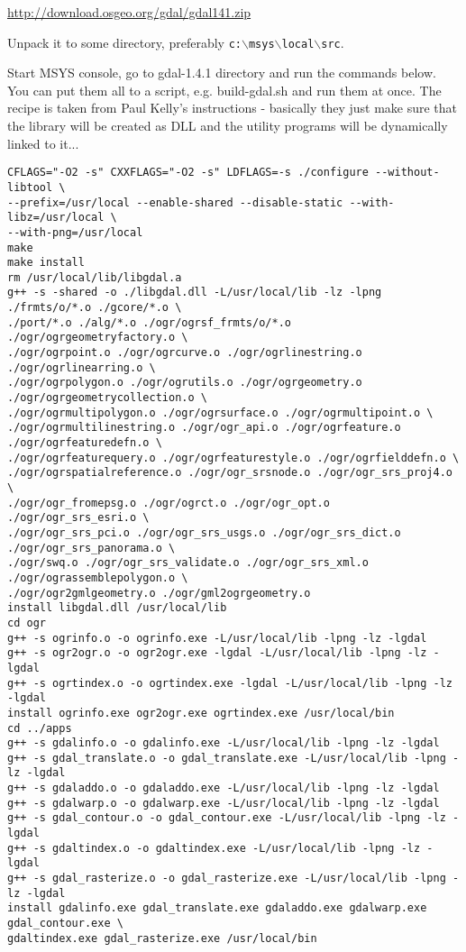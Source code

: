 \url{http://download.osgeo.org/gdal/gdal141.zip}

Unpack it to some directory, preferably \texttt{c:$\backslash$msys$\backslash$local$\backslash$src}.

Start MSYS console, go to gdal-1.4.1 directory and run the commands below.
You can put them all to a script, e.g. build-gdal.sh and run them at once.
The recipe is taken from Paul Kelly's instructions - basically they
just make sure that the library will be created as DLL and the utility
programs will be dynamically linked to it...

\begin{verbatim}
CFLAGS="-O2 -s" CXXFLAGS="-O2 -s" LDFLAGS=-s ./configure --without-libtool \
--prefix=/usr/local --enable-shared --disable-static --with-libz=/usr/local \
--with-png=/usr/local
make
make install
rm /usr/local/lib/libgdal.a
g++ -s -shared -o ./libgdal.dll -L/usr/local/lib -lz -lpng ./frmts/o/*.o ./gcore/*.o \
./port/*.o ./alg/*.o ./ogr/ogrsf_frmts/o/*.o ./ogr/ogrgeometryfactory.o \
./ogr/ogrpoint.o ./ogr/ogrcurve.o ./ogr/ogrlinestring.o ./ogr/ogrlinearring.o \
./ogr/ogrpolygon.o ./ogr/ogrutils.o ./ogr/ogrgeometry.o ./ogr/ogrgeometrycollection.o \
./ogr/ogrmultipolygon.o ./ogr/ogrsurface.o ./ogr/ogrmultipoint.o \
./ogr/ogrmultilinestring.o ./ogr/ogr_api.o ./ogr/ogrfeature.o ./ogr/ogrfeaturedefn.o \ 
./ogr/ogrfeaturequery.o ./ogr/ogrfeaturestyle.o ./ogr/ogrfielddefn.o \
./ogr/ogrspatialreference.o ./ogr/ogr_srsnode.o ./ogr/ogr_srs_proj4.o \
./ogr/ogr_fromepsg.o ./ogr/ogrct.o ./ogr/ogr_opt.o ./ogr/ogr_srs_esri.o \
./ogr/ogr_srs_pci.o ./ogr/ogr_srs_usgs.o ./ogr/ogr_srs_dict.o ./ogr/ogr_srs_panorama.o \
./ogr/swq.o ./ogr/ogr_srs_validate.o ./ogr/ogr_srs_xml.o ./ogr/ograssemblepolygon.o \
./ogr/ogr2gmlgeometry.o ./ogr/gml2ogrgeometry.o
install libgdal.dll /usr/local/lib
cd ogr
g++ -s ogrinfo.o -o ogrinfo.exe -L/usr/local/lib -lpng -lz -lgdal
g++ -s ogr2ogr.o -o ogr2ogr.exe -lgdal -L/usr/local/lib -lpng -lz -lgdal
g++ -s ogrtindex.o -o ogrtindex.exe -lgdal -L/usr/local/lib -lpng -lz -lgdal
install ogrinfo.exe ogr2ogr.exe ogrtindex.exe /usr/local/bin
cd ../apps
g++ -s gdalinfo.o -o gdalinfo.exe -L/usr/local/lib -lpng -lz -lgdal
g++ -s gdal_translate.o -o gdal_translate.exe -L/usr/local/lib -lpng -lz -lgdal
g++ -s gdaladdo.o -o gdaladdo.exe -L/usr/local/lib -lpng -lz -lgdal
g++ -s gdalwarp.o -o gdalwarp.exe -L/usr/local/lib -lpng -lz -lgdal
g++ -s gdal_contour.o -o gdal_contour.exe -L/usr/local/lib -lpng -lz -lgdal
g++ -s gdaltindex.o -o gdaltindex.exe -L/usr/local/lib -lpng -lz -lgdal
g++ -s gdal_rasterize.o -o gdal_rasterize.exe -L/usr/local/lib -lpng -lz -lgdal
install gdalinfo.exe gdal_translate.exe gdaladdo.exe gdalwarp.exe gdal_contour.exe \
gdaltindex.exe gdal_rasterize.exe /usr/local/bin

\end{verbatim}

